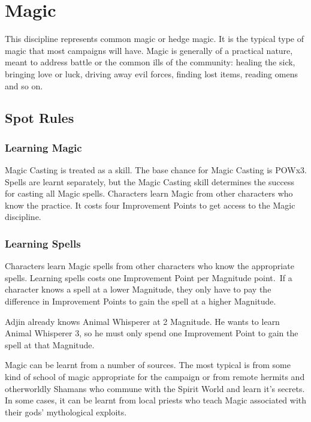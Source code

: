 \chapter{Magic}
\label{ch:magic}

This discipline represents common magic or hedge magic. It is the typical type of magic that most campaigns will have. Magic is generally of a practical nature, meant to address battle or the common ills of the community: healing the sick, bringing love or luck, driving away evil forces, finding lost items, reading omens and so on. 


\section{Spot Rules}

\subsection{Learning Magic}
Magic Casting is treated as a skill. The base chance for Magic Casting is POWx3. Spells are learnt separately, but the Magic Casting skill determines the success for casting all Magic spells. Characters learn Magic from other characters who know the practice. It costs four Improvement Points to get access to the Magic discipline.

\subsection{Learning Spells}
Characters learn Magic spells from other characters who know the appropriate spells. Learning spells costs one Improvement Point per Magnitude point. If a character knows a spell at a lower Magnitude, they only have to pay the difference in Improvement Points to gain the spell at a higher Magnitude.

\begin{rpg-examplebox}
Adjin already knows Animal Whisperer at 2 Magnitude. He wants to learn Animal Whisperer 3, so he must only spend one Improvement Point to gain the spell at that Magnitude.
\end{rpg-examplebox}

Magic can be learnt from a number of sources. The most typical is from some kind of school of magic appropriate for the campaign or from remote hermits and otherworldly Shamans who commune with the Spirit World and learn it's secrets. In some cases, it can be learnt from local priests who teach Magic associated with their gods’ mythological exploits.

